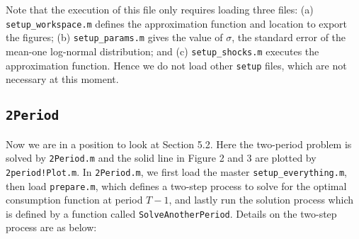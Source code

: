 \documentclass[titlepage,abstract]{\econtex}
\begin{document}
Note that the execution of this file only requires loading three files: (a) \texttt{setup\_workspace.m} defines the approximation function and location to export the figures; (b) \texttt{setup\_params.m} gives the value of $\sigma$, the standard error of the mean-one log-normal distribution; and (c) \texttt{setup\_shocks.m} executes the approximation function. Hence we do not load other \texttt{setup} files, which are not necessary at this moment.

\subsection{\texttt{2Period}}
Now we are in a position to look at Section 5.2. Here the two-period problem is solved by \texttt{2Period.m} and the solid line in Figure 2 and 3 are plotted by \texttt{2period!Plot.m}. In \texttt{2Period.m}, we first load the master \texttt{setup\_everything.m}, then load \texttt{prepare.m}, which defines a two-step process to solve for the optimal consumption function at period $T-1$, and lastly run the solution process which is defined by a function called \texttt{SolveAnotherPeriod}. Details on the two-step process are as below:
\end{document}
